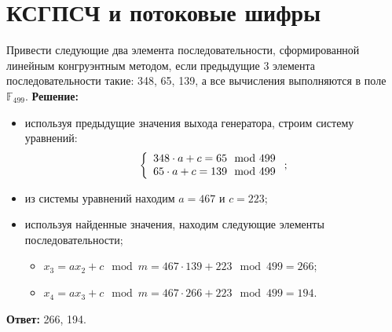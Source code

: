 \section{КСГПСЧ и потоковые шифры}
\tasksection

\tasknumber Привести следующие два элемента последовательности, сформированной линейным конгруэнтным методом, если предыдущие 3 элемента последовательности такие: 348, 65, 139, а все вычисления выполняются в поле $\mathbb{F}_{499}$.
\medbreak
\textbf{Решение:}
\begin{itemize}\itemsep1pt \parskip0pt 
	\item используя предыдущие значения выхода генератора, строим систему уравнений:
		\[\left\{ {\begin{array}{*{20}c}
		348 \cdot a + c = 65 \mod 499 \\
		65 \cdot a + c = 139 \mod 499 \\
		\end{array} } \right. ;\]
	\item из системы уравнений находим $a = 467$ и $c = 223$;
	\item используя найденные значения, находим следующие элементы последовательности;
	\begin{itemize}\itemsep1pt \parskip0pt 
		\item $x_{3} = a x_{2} + c \mod m = 467 \cdot 139 + 223 \mod 499 = 266$;
		\item $x_{4} = a x_{3} + c \mod m = 467 \cdot 266 + 223 \mod 499 = 194$.
	\end{itemize}
\end{itemize}
\medbreak
\textbf{Ответ:} 266, 194.
\bigbreak

